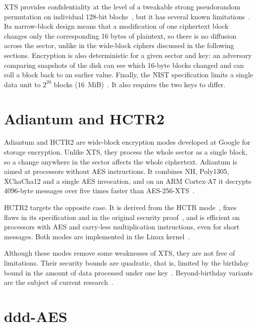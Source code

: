 \documentclass[
  digital,     %
  oneside,     %
  nosansbold,  %
  nocolorbold, %
  lof,         %
  lot,         %
]{fithesis4}
\begin{document}
XTS provides confidentiality at the level of a tweakable strong pseudorandom permutation on individual 128-bit blocks~\cite{rogaway_efficient_2004}, but it has several known limitations~\cite{martin_xts_2010, dworkin_recommendation_2010}. Its narrow-block design means that a modification of one ciphertext block changes only the corresponding 16 bytes of plaintext, so there is no diffusion across the sector, unlike in the wide-block ciphers discussed in the following sections. 
Encryption is also deterministic for a given sector and key: an adversary comparing snapshots of the disk can see which 16-byte blocks changed and can roll a block back to an earlier value. Finally, the NIST specification limits a single data unit to $2^{20}$ blocks (16~MiB)~\cite{dworkin_recommendation_2010}. It also requires the two keys to differ.

\section{Adiantum and HCTR2}
\label{sec:adiantumNhctr2}

Adiantum and HCTR2 are wide-block encryption modes developed at Google for storage encryption. Unlike XTS, they process the whole sector as a single block, so a change anywhere in the sector affects the whole ciphertext. Adiantum is aimed at processors without AES instructions. It combines NH, Poly1305, XChaCha12 and a single AES invocation, and on an ARM Cortex-A7 it decrypts 4096-byte messages over five times faster than AES-256-XTS~\cite{crowley_adiantum_2018}.

HCTR2 targets the opposite case. It is derived from the HCTR mode~\cite{wang_hctr_2005}, fixes flaws in its specification and in the original security proof~\cite{crowley_length-preserving_2021, chakraborty_improved_2008}, and is efficient on processors with AES and carry-less multiplication instructions, even for short messages. Both modes are implemented in the Linux kernel~\cite{noauthor_linuxcryptohctr2c_nodate, noauthor_linuxcryptohctr2c_nodate}.

Although these modes remove some weaknesses of XTS, they are not free of limitations. Their security bounds are quadratic, that is, limited by the birthday bound in the amount of data processed under one key~\cite{crowley_adiantum_2018, crowley_length-preserving_2021}. Beyond-birthday variants are the subject of current research~\cite{ozturk_hctr_2026, chen_beyond-birthday-bound_2026}.

\section{ddd-AES}
\label{sec:dddAes}
\end{document}
